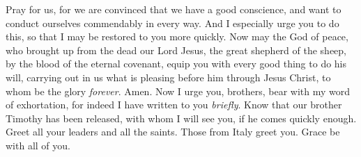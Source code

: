 \begin{biblechapter}
\verse Pray for us, for we are convinced that we have a good conscience, and want to conduct ourselves commendably in every way.
\verse And I especially urge you to do this, so that I may be restored to you more quickly.
 Now may the God of peace, who brought up from the dead our Lord Jesus, the great shepherd of the sheep, by the blood of the eternal covenant,
\verse equip you with every good thing to do his will, carrying out in us what is pleasing before him through Jesus Christ, to whom be the glory \textit{forever}. Amen.
 Now I urge you, brothers, bear with my word of exhortation, for indeed I have written to you \textit{briefly}.
\verse Know that our brother Timothy has been released, with whom I will see you, if he comes quickly enough.
\verse Greet all your leaders and all the saints. Those from Italy greet you.
\verse Grace be with all of you.
\end{biblechapter}

